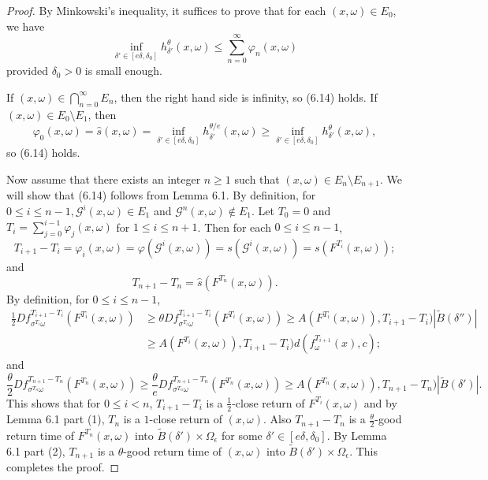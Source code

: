 \documentclass[11pt,oneside]{article}
\theoremstyle{plain}
\numberwithin{equation}{section}
\numberwithin{figure}{section}
\numberwithin{table}{section}
\begin{document}
\begin{proof}
By Minkowski's inequality, it suffices to prove that for each $(x, \omega) \in E_0$, we have
\begin{equation}
\inf_{\delta' \in [e\delta, \delta_0]} h_{\delta'}^{\theta} (x, \omega) \leq \sum_{n=0}^{\infty} \varphi_n(x, \omega)
\end{equation}
provided $\delta_0 > 0$ is small enough.


If $(x, \omega) \in \bigcap_{n=0}^{\infty} E_n$, then the right hand side is infinity, so (6.14) holds. If $(x, \omega) \in E_0 \setminus E_1$, then  
\[
\varphi_0(x, \omega) = \hat s(x, \omega)  = \inf_{\delta' \in [e\delta, \delta_0]} h_{\delta'}^{\theta/e} (x, \omega) \geq \inf_{\delta' \in [e\delta, \delta_0]} h_{\delta'}^{\theta} (x, \omega),
\]
so (6.14) holds.


Now assume that there exists an integer $n \geq 1$ such that $(x, \omega) \in E_n \setminus E_{n+1}$. We will show that (6.14) follows from Lemma 6.1. By definition, for $0 \leq i \leq n-1, \mathscr G^i(x, \omega) \in E_1$ and $\mathscr G^n(x, \omega) \notin E_1$. Let $T_0 = 0$ and $T_i = \sum_{j=0}^{i-1} \varphi_j(x, \omega) $ for $1 \leq i \leq n+1$. Then for each $0 \leq i \leq n-1$,
\[
T_{i+1} - T_i = \varphi_i(x, \omega) = \varphi(\mathscr G^i(x, \omega)) = s (\mathscr G^i(x, \omega)) = s (F^{T_i}(x, \omega));
\]
and 
\[
T_{n+1} - T_n = \hat s(F^{T_n}(x, \omega)).
\]
By definition, for $0 \leq i \leq n-1$,
\begin{align*}
\frac{1}{2} Df_{\sigma^{T_i}\omega}^{T_{i+1} - T_i } ( F^{T_i}(x, \omega))& \geq \theta Df_{\sigma^{T_i}\omega}^{T_{i+1} - T_i } ( F^{T_i}(x, \omega))  \geq A(F^{T_i}(x, \omega)), T_{i+1} - T_i ) | \tilde B(\delta'') |\\
& \geq A(F^{T_i}(x, \omega)), T_{i+1} - T_i ) d(f_{\omega}^{T_{i+1}}(x), c);
\end{align*}
and 
\[
\frac{\theta}{2} Df_{\sigma^{T_n}\omega}^{T_{n+1} - T_n} ( F^{T_n}(x, \omega)) \geq \frac{\theta}{e} Df_{\sigma^{T_n}\omega}^{T_{n+1} - T_n} ( F^{T_n}(x, \omega))  \geq  A(F^{T_n}(x, \omega)), T_{n+1} - T_n ) | \tilde B(\delta') |.
 \]
This shows that for $0 \leq i < n$, $T_{i+1} - T_i$ is a $\frac{1}{2}$-close return of $F^{T_i}(x, \omega)$ and by Lemma 6.1 part (1), $T_n$ is a $1$-close return of $(x, \omega)$. Also $T_{n+1} - T_n$ is a $\frac{\theta}{2}$-good return time of $F^{T_n}(x, \omega)$ into $\tilde B(\delta') \times \Omega_{\epsilon}$ for some $\delta' \in [e\delta, \delta_0]$. By Lemma 6.1 part (2), $T_{n+1}$ is a $\theta$-good return time of $(x, \omega)$ into $\tilde B(\delta') \times \Omega_{\epsilon}$. This completes the proof.

\end{proof}
\end{document}
